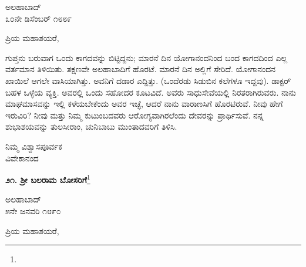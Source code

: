 \vspace{-0.5cm}

\begin{flushright}
ಅಲಹಾಬಾದ್\\೩೦ನೇ ಡಿಸೆಂಬರ್ ೧೮೮೯
\end{flushright}

\noindent
ಪ್ರಿಯ ಮಹಾಶಯರೆ,

ಗುಪ್ತನು ಬರುವಾಗ ಒಂದು ಕಾಗದವನ್ನು ಬಿಟ್ಟಿದ್ದನು; ಮಾರನೆ ದಿನ ಯೋಗಾನಂದನಿಂದ ಬಂದ ಕಾಗದದಿಂದ ಎಲ್ಲ ವರ್ತಮಾನ ತಿಳಿಯಿತು. ತಕ್ಷಣವೇ ಅಲಹಾಬಾದಿಗೆ ಹೊರಟೆ. ಮಾರನೆ ದಿನ ಅಲ್ಲಿಗೆ ಸೇರಿದೆ. ಯೋಗಾನಂದನ ಖಾಯಿಲೆ ಆಗಲೇ ವಾಸಿಯಾಗಿತ್ತು. ಅವನಿಗೆ ದಡಾರ ಎದ್ದಿತ್ತು. (ಒಂದೆರಡು ಸಿಡುಬಿನ ಕಲೆಗಳೂ ಇದ್ದವು). ಡಾಕ್ಟರ್ ಬಹಳ ಒಳ್ಳೆಯ ವ್ಯಕ್ತಿ. ಅವರಲ್ಲಿ ಒಂದು ಸಹೋದರ ಕೂಟವಿದೆ. ಅವರು ಸಾಧುಸೇವೆಯಲ್ಲಿ ನಿರತರಾಗಿರುವರು. ನಾನು ಮಾಘಮಾಸವನ್ನು ಇಲ್ಲಿ ಕಳೆಯಬೇಕೆಂದು ಅವರ ಇಚ್ಛೆ, ಆದರೆ ನಾನು ವಾರಾಣಸಿಗೆ ಹೊರಟಿರುವೆ. ನೀವು ಹೇಗೆ ಇರುವಿರಿ? ನೀವು ಮತ್ತು ನಿಮ್ಮ ಕುಟುಂಬದವರು ಆರೋಗ್ಯವಾಗಿರಲೆಂದು ದೇವರನ್ನು ಪ್ರಾರ್ಥಿಸುವೆ. ನನ್ನ ಶುಭಾಶಯವನ್ನು ತುಲಸೀರಾಂ, ಚುನಿಬಾಬು ಮುಂತಾದವರಿಗೆ ತಿಳಿಸಿ.

\vspace{-0.5cm}

{\flushright
ನಿಮ್ಮ ವಿಶ್ವಾಸಪೂರ್ವಕ\\ವಿವೇಕಾನಂದ\par}

\begin{center}
\textbf{೨೧. ಶ‍್ರೀ ಬಲರಾಮ ಬೋಸರಿಗೆ}\footnote{}
\end{center}

\vspace{-0.5cm}

\begin{flushright}
ಅಲಹಾಬಾದ್\\೫ನೇ ಜನವರಿ ೧೮೯೦
\end{flushright}

\noindent
ಪ್ರಿಯ ಮಹಾಶಯರೆ,


